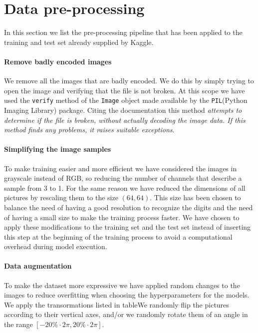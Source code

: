 \section{Data pre-processing}\label{1_preProcessing}
In this section we list the pre-processing pipeline that has been applied to the training and test set already supplied by Kaggle.

\paragraph{Remove badly encoded images}
We remove all the images that are badly encoded. We do this by simply trying to open the image and verifying that the file is not broken. At this scope we have used the \texttt{verify} method of the \texttt{Image} object made available by the \texttt{PIL}(Python Imaging Library) package. Citing the documentation this method \textit{attempts to determine if the file is broken, without actually decoding the image data. If this method finds any problems, it raises suitable exceptions}.

\paragraph{Simplifying the image samples}
To make training easier and more efficient we have considered the images in grayscale instead of RGB, so reducing the number of channels that describe a sample from 3 to 1. For the same reason we have reduced the dimensions of all pictures by rescaling them to the size $\left(64,64\right)$. This size has been chosen to balance the need of having a good resolution to recognize the digits and the need of having a small size to make the training process faster. We have chosen to apply these modifications to the training set and the test set instead of inserting this step at the beginning of the training process to avoid a computational overhead during model execution.

\paragraph{Data augmentation}
To make the dataset more expressive we have applied random changes to the images to reduce overfitting when choosing the hyperparameters for the models. We apply the transormations listed in tableWe randomly flip the pictures according to their vertical axes, and/or we randomly rotate them of an angle in the range $\left[-20\% \cdot 2\pi, 20\% \cdot 2\pi\right]$.

